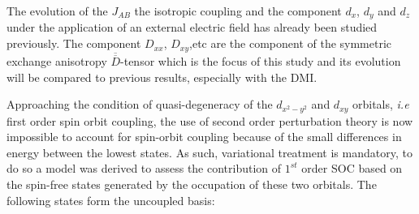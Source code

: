\documentclass[10pt]{report}
\numberwithin{equation}{section}
\begin{document}
\begin{center}
\end{center}
The evolution of the $J_{AB}$ the isotropic coupling and the component $d_x$, $d_y$ and $d_z$ under the application of an external electric field has already been studied previously.
The component $D_{xx}$, $D_{xy}$,etc are the component of the symmetric exchange anisotropy $\overline{\overline{D}}$-tensor which is the focus of this study and its evolution will be compared to previous results, especially with the DMI.

Approaching the condition of quasi-degeneracy of the $d_{x^2-y^2}$ and $d_{xy}$ orbitals, \textit{i.e} first order spin orbit coupling, the use of second order perturbation theory is now impossible to account for spin-orbit coupling because of the small differences in energy between the lowest states.
As such, variational treatment is mandatory, to do so a model was derived to assess the contribution of $1^{st}$ order SOC based on the spin-free states generated by the occupation of these two orbitals.
The following states form the uncoupled basis:
\end{document}
